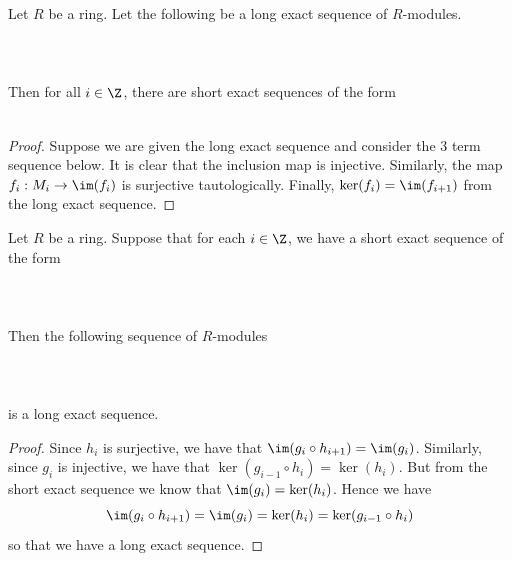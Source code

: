 \documentclass[a4paper]{article}
\begin{document}
\begin{prp}{}{} Let $R$ be a ring. Let the following be a long exact sequence of $R$-modules. \\~\\
\\~\\
Then for all $i\in\Z$, there are short exact sequences of the form \\~\\
\begin{proof}
Suppose we are given the long exact sequence and consider the 3 term sequence below. It is clear that the inclusion map is injective. Similarly, the map $f_i:M_i\to\im(f_i)$ is surjective tautologically. Finally, $\ker(f_i)=\im(f_{i+1})$ from the long exact sequence. 
\end{proof}
\end{prp}

\begin{prp}{}{} Let $R$ be a ring. Suppose that for each $i\in\Z$, we have a short exact sequence of the form \\~\\
 \\~\\
Then the following sequence of $R$-modules \\~\\
\\~\\
is a long exact sequence. 
\begin{proof}
Since $h_i$ is surjective, we have that $\im(g_i\circ h_{i+1})=\im(g_i)$. Similarly, since $g_i$ is injective, we have that $\ker(g_{i-1}\circ h_i)=\ker(h_i)$. But from the short exact sequence we know that $\im(g_i)=\ker(h_i)$. Hence we have $$\im(g_i\circ h_{i+1})=\im(g_i)=\ker(h_i)=\ker(g_{i-1}\circ h_i)$$ so that we have a long exact sequence. 
\end{proof}
\end{prp}
\end{document}
